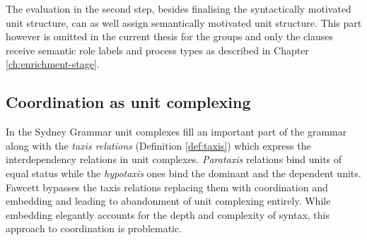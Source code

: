 The evaluation in the second step, besides finalising the syntactically motivated unit structure, can as well assign semantically motivated unit structure. This part however is omitted in the current thesis for the groups and only the clauses receive semantic role labels and process types as described in Chapter \ref{ch:enrichment-stage}.





\subsection{Coordination as unit complexing} %
\label{sec:coordination}

In the Sydney Grammar unit complexes fill an important part of the grammar along with the \textit{taxis relations} (Definition \ref{def:taxis}) which express the interdependency relations in unit complexes. \textit{Parataxis} relations bind units of equal status while the \textit{hypotaxis} ones bind the dominant and the dependent units. Fawcett bypasses the taxis relations replacing them with coordination and embedding \citep[271]{Fawcett2000} and leading to abandonment of unit complexing entirely. While embedding elegantly accounts for the depth and complexity of syntax, this approach to coordination is problematic.

